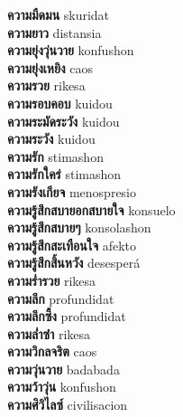 \textbf{ ความมืดมน  } skuridat \\
\textbf{ ความยาว  } distansia \\
\textbf{ ความยุ่งวุ่นวาย  } konfushon \\
\textbf{ ความยุ่งเหยิง  } caos \\
\textbf{ ความรวย  } rikesa \\
\textbf{ ความรอบคอบ  } kuidou \\
\textbf{ ความระมัดระวัง  } kuidou \\
\textbf{ ความระวัง  } kuidou \\
\textbf{ ความรัก  } stimashon \\
\textbf{ ความรักใคร่  } stimashon \\
\textbf{ ความรังเกียจ  } menospresio \\
\textbf{ ความรู้สึกสบายอกสบายใจ  } konsuelo \\
\textbf{ ความรู้สึกสบายๆ  } konsolashon \\
\textbf{ ความรู้สึกสะเทือนใจ  } afekto \\
\textbf{ ความรู้สึกสิ้นหวัง  } desesperá \\
\textbf{ ความร่ำรวย  } rikesa \\
\textbf{ ความลึก  } profundidat \\
\textbf{ ความลึกซึ้ง  } profundidat \\
\textbf{ ความล่ำซำ  } rikesa \\
\textbf{ ความวิกลจริต  } caos \\
\textbf{ ความวุ่นวาย  } badabada \\
\textbf{ ความว้าวุ่น  } konfushon \\
\textbf{ ความศิวิไลซ์  } civilisacion \\
